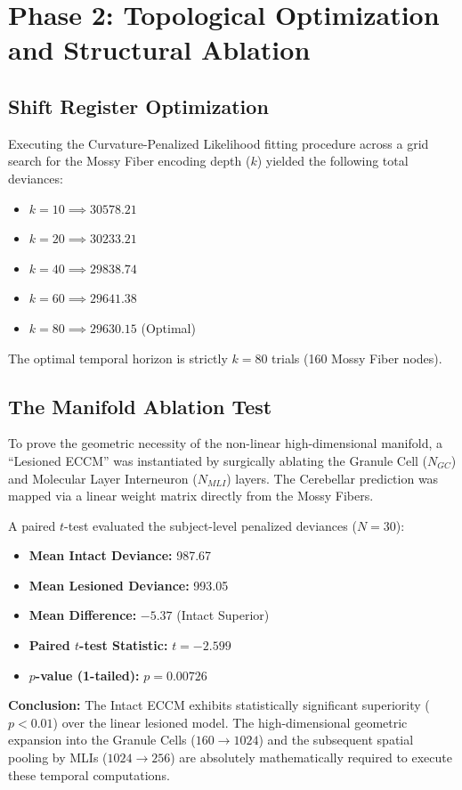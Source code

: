 \documentclass[11pt,a4paper]{article}
\begin{document}
\section{Phase 2: Topological Optimization and Structural Ablation}

\subsection{Shift Register Optimization}
Executing the Curvature-Penalized Likelihood fitting procedure across a grid search for the Mossy Fiber encoding depth ($k$) yielded the following total deviances:
\begin{itemize}
    \item $k = 10 \implies 30578.21$
    \item $k = 20 \implies 30233.21$
    \item $k = 40 \implies 29838.74$
    \item $k = 60 \implies 29641.38$
    \item \textbf{$k = 80 \implies 29630.15$} (Optimal)
\end{itemize}
The optimal temporal horizon is strictly $k = 80$ trials (160 Mossy Fiber nodes).

\subsection{The Manifold Ablation Test}
To prove the geometric necessity of the non-linear high-dimensional manifold, a ``Lesioned ECCM'' was instantiated by surgically ablating the Granule Cell ($N_{GC}$) and Molecular Layer Interneuron ($N_{MLI}$) layers. The Cerebellar prediction was mapped via a linear weight matrix directly from the Mossy Fibers.

A paired $t$-test evaluated the subject-level penalized deviances ($N=30$):
\begin{itemize}
    \item \textbf{Mean Intact Deviance:} 987.67
    \item \textbf{Mean Lesioned Deviance:} 993.05
    \item \textbf{Mean Difference:} $-5.37$ (Intact Superior)
    \item \textbf{Paired $t$-test Statistic:} $t = -2.599$
    \item \textbf{$p$-value (1-tailed):} $p = 0.00726$
\end{itemize}

\textbf{Conclusion:} The Intact ECCM exhibits statistically significant superiority ($p < 0.01$) over the linear lesioned model. The high-dimensional geometric expansion into the Granule Cells ($160 \to 1024$) and the subsequent spatial pooling by MLIs ($1024 \to 256$) are absolutely mathematically required to execute these temporal computations.
\end{document}
